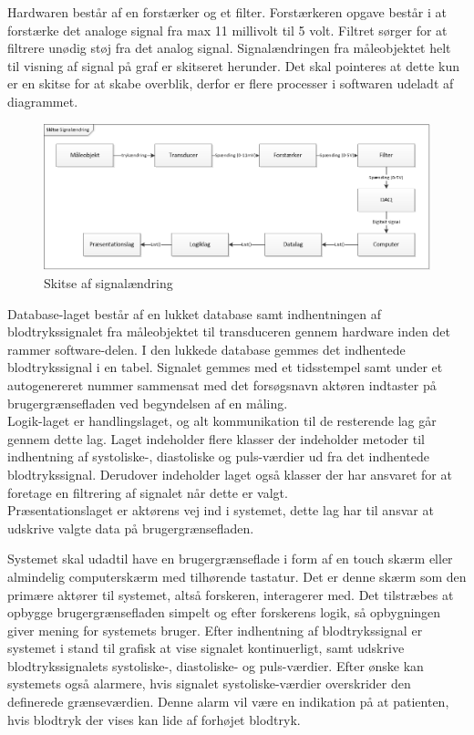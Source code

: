 Hardwaren består af en forstærker og et filter. Forstærkeren opgave består i at forstærke det analoge signal fra max 11 millivolt til 5 volt. Filtret sørger for at filtrere unødig støj fra det analog signal. Signalændringen fra måleobjektet helt til visning af signal på graf er skitseret herunder. Det skal pointeres at dette kun er en skitse for at skabe overblik, derfor er flere processer i softwaren udeladt af diagrammet. 
\begin{figure}[htb]
	\centering
	\includegraphics[width=1.0\textwidth]{Figurer/Signalandring}
	\caption{Skitse af signalændring}
\end{figure}
Database-laget består af en lukket database samt indhentningen af blodtrykssignalet fra måleobjektet til transduceren gennem hardware inden det rammer software-delen. I den lukkede database gemmes det indhentede blodtrykssignal i en tabel. Signalet gemmes med et tidsstempel samt under et autogenereret nummer sammensat med det forsøgsnavn aktøren indtaster på brugergrænsefladen ved begyndelsen af en måling. \\
Logik-laget er handlingslaget, og alt kommunikation til de resterende lag går gennem dette lag. Laget indeholder flere klasser der indeholder metoder til indhentning af systoliske-, diastoliske og puls-værdier ud fra det indhentede blodtrykssignal. Derudover indeholder laget også klasser der har ansvaret for at foretage en filtrering af signalet når dette er valgt. \\ Præsentationslaget er aktørens vej ind i systemet, dette lag har til ansvar at udskrive valgte data på brugergrænsefladen. 

Systemet skal udadtil have en brugergrænseflade i form af en touch skærm eller almindelig computerskærm med tilhørende tastatur. Det er denne skærm som den primære aktører til systemet, altså forskeren, interagerer med. Det tilstræbes at opbygge brugergrænsefladen simpelt og efter forskerens logik, så opbygningen giver mening for systemets bruger. Efter indhentning af blodtrykssignal er systemet i stand til grafisk at vise signalet kontinuerligt, samt udskrive blodtrykssignalets systoliske-, diastoliske- og puls-værdier. Efter ønske kan systemets også alarmere, hvis signalet systoliske-værdier overskrider den definerede grænseværdien. Denne alarm vil være en indikation på at patienten, hvis blodtryk der vises kan lide af forhøjet blodtryk.

